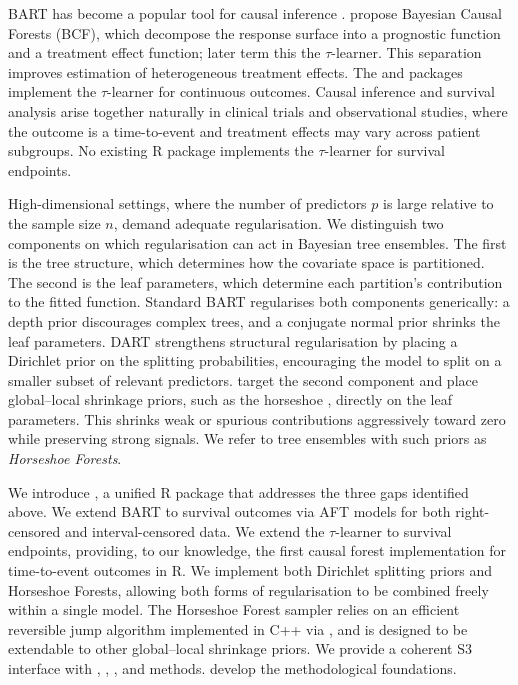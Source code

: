 BART has become a popular tool for causal inference \citep{hill2011bayesian, dorie2019automated}. \citet{hahn2020bayesian} propose Bayesian Causal Forests (BCF), which decompose the response surface into a prognostic function and a treatment effect function; \citet{caron2022estimating} later term this the \(\tau\)-learner. This separation improves estimation of heterogeneous treatment effects. The  and  packages implement the \(\tau\)-learner for continuous outcomes. Causal inference and survival analysis arise together naturally in clinical trials and observational studies, where the outcome is a time-to-event and treatment effects may vary across patient subgroups. No existing R package implements the \(\tau\)-learner for survival endpoints.

High-dimensional settings, where the number of predictors \(p\) is large relative to the sample size \(n\), demand adequate regularisation. We distinguish two components on which regularisation can act in Bayesian tree ensembles. The first is the tree structure, which determines how the covariate space is partitioned. The second is the leaf parameters, which determine each partition's contribution to the fitted function. Standard BART regularises both components generically: a depth prior discourages complex trees, and a conjugate normal prior shrinks the leaf parameters. DART \citep{linero2018dart} strengthens structural regularisation by placing a Dirichlet prior on the splitting probabilities, encouraging the model to split on a smaller subset of relevant predictors. \citet{jacobs2025horseshoe} target the second component and place global--local shrinkage priors, such as the horseshoe \citep{carvalho2010horseshoe}, directly on the leaf parameters. This shrinks weak or spurious contributions aggressively toward zero while preserving strong signals. We refer to tree ensembles with such priors as \emph{Horseshoe Forests}.

We introduce , a unified R package that addresses the three
gaps identified above. We extend BART to survival outcomes via AFT models for both
right-censored and interval-censored data. We extend the \(\tau\)-learner to survival endpoints,
providing, to our knowledge, the first causal forest implementation for time-to-event
outcomes in R. We implement both Dirichlet splitting priors and Horseshoe Forests,
allowing both forms of regularisation to be combined freely within a single model.
The Horseshoe Forest sampler relies on an efficient reversible jump algorithm
implemented in C++ via  \citep{eddelbuettel2011rcpp}, and is designed to
be extendable to other global--local shrinkage priors. We provide a coherent S3
interface with , , , and  methods. \citet{jacobs2025horseshoe} develop the methodological foundations.

